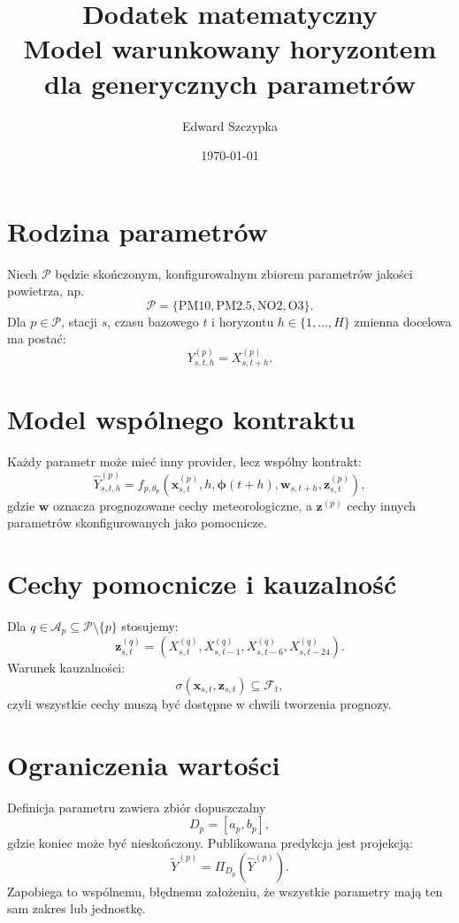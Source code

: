 \documentclass[11pt,a4paper]{article}
\title{Dodatek matematyczny\\Model warunkowany horyzontem dla generycznych parametrów}
\author{Edward Szczypka}
\date{\today}
\begin{document}
\maketitle

\section{Rodzina parametrów}

Niech $\mathcal P$ będzie skończonym, konfigurowalnym zbiorem parametrów
jakości powietrza, np.
\[
 \mathcal P=\{\mathrm{PM10},\mathrm{PM2.5},\mathrm{NO2},\mathrm{O3}\}.
\]
Dla $p\in\mathcal P$, stacji $s$, czasu bazowego $t$ i horyzontu
$h\in\{1,\ldots,H\}$ zmienna docelowa ma postać:
\[
 Y^{(p)}_{s,t,h}=X^{(p)}_{s,t+h}.
\]

\section{Model wspólnego kontraktu}

Każdy parametr może mieć inny provider, lecz wspólny kontrakt:
\[
 \widehat Y^{(p)}_{s,t,h}
 =f_{p,\theta_p}\!\left(
      \bm x^{(p)}_{s,t},
      h,
      \bm\phi(t+h),
      \bm w_{s,t+h},
      \bm z^{(p)}_{s,t}
   \right),
\]
gdzie $\bm w$ oznacza prognozowane cechy meteorologiczne, a
$\bm z^{(p)}$ cechy innych parametrów skonfigurowanych jako pomocnicze.

\section{Cechy pomocnicze i kauzalność}

Dla $q\in\mathcal A_p\subseteq\mathcal P\setminus\{p\}$ stosujemy:
\[
 \bm z^{(q)}_{s,t}
 =\left(X^{(q)}_{s,t},X^{(q)}_{s,t-1},X^{(q)}_{s,t-6},X^{(q)}_{s,t-24}\right).
\]
Warunek kauzalności:
\[
 \sigma(\bm x_{s,t},\bm z_{s,t})\subseteq\mathcal F_t,
\]
czyli wszystkie cechy muszą być dostępne w chwili tworzenia prognozy.

\section{Ograniczenia wartości}

Definicja parametru zawiera zbiór dopuszczalny
\[
 D_p=[a_p,b_p],
\]
gdzie koniec może być nieskończony. Publikowana predykcja jest projekcją:
\[
 \widetilde Y^{(p)}=\Pi_{D_p}(\widehat Y^{(p)}).
\]
Zapobiega to wspólnemu, błędnemu założeniu, że wszystkie parametry mają ten sam
zakres lub jednostkę.
\end{document}
